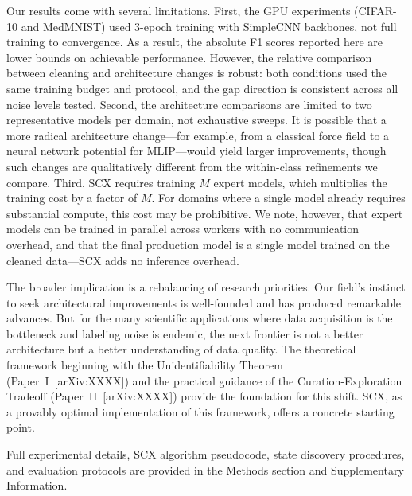 \documentclass[12pt,a4paper]{article}
\begin{document}
Our results come with several limitations. First, the GPU experiments (CIFAR-10 and MedMNIST) used 3-epoch training with SimpleCNN backbones, not full training to convergence. As a result, the absolute F1 scores reported here are lower bounds on achievable performance. However, the relative comparison between cleaning and architecture changes is robust: both conditions used the same training budget and protocol, and the gap direction is consistent across all noise levels tested. Second, the architecture comparisons are limited to two representative models per domain, not exhaustive sweeps. It is possible that a more radical architecture change---for example, from a classical force field to a neural network potential for MLIP---would yield larger improvements, though such changes are qualitatively different from the within-class refinements we compare. Third, SCX requires training $M$ expert models, which multiplies the training cost by a factor of $M$. For domains where a single model already requires substantial compute, this cost may be prohibitive. We note, however, that expert models can be trained in parallel across workers with no communication overhead, and that the final production model is a single model trained on the cleaned data---SCX adds no inference overhead.

The broader implication is a rebalancing of research priorities. Our field's instinct to seek architectural improvements is well-founded and has produced remarkable advances. But for the many scientific applications where data acquisition is the bottleneck and labeling noise is endemic, the next frontier is not a better architecture but a better understanding of data quality. The theoretical framework beginning with the Unidentifiability Theorem (Paper~I~[arXiv:XXXX]) and the practical guidance of the Curation-Exploration Tradeoff (Paper~II~[arXiv:XXXX]) provide the foundation for this shift. SCX, as a provably optimal implementation of this framework, offers a concrete starting point.

\begin{methods}
Full experimental details, SCX algorithm pseudocode, state discovery procedures, and evaluation protocols are provided in the Methods section and Supplementary Information.
\end{methods}

\begin{flushleft}
\end{flushleft}
\end{document}
